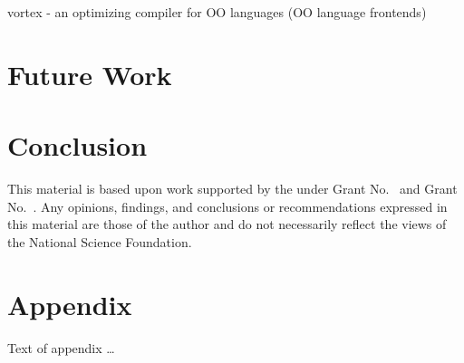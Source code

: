 \documentclass[sigplan,review,anonymous]{acmart}\settopmatter{printfolios=true,printccs=false,printacmref=false}
\begin{document}
vortex - an optimizing compiler for OO languages (OO language frontends)

\section{Future Work} \label{future}
\section{Conclusion} \label{conclusions}


\begin{acks}                            %
  This material is based upon work supported by the
   under Grant
  No.~ and Grant
  No.~.  Any opinions, findings, and
  conclusions or recommendations expressed in this material are those
  of the author and do not necessarily reflect the views of the
  National Science Foundation.
\end{acks}





\appendix
\section{Appendix}

Text of appendix \ldots
\end{document}
